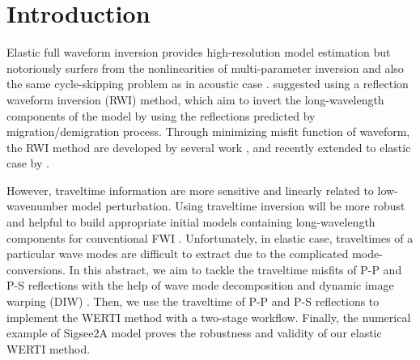 \section{Introduction}
Elastic full
waveform inversion provides high-resolution 
model estimation but notoriously surfers from the nonlinearities of
multi-parameter inversion and also the same cycle-skipping problem as in acoustic
case \cite[]{sears:2008,brossier2009}.
\cite{xu:2012} suggested using a reflection waveform inversion (RWI) method, 
which aim to
invert the long-wavelength components of the model by using the reflections 
predicted by migration/demigration process.
Through minimizing misfit function of waveform, the RWI method are developed
by several work \cite[]{Wu2015b,Zhou2015}, and recently extended to elastic case by
\cite{Guo2016}.

However, traveltime information are more sensitive and linearly related to
low-wavenumber model perturbation. Using traveltime inversion will be more robust and helpful to
build appropriate initial models containing long-wavelength components for
conventional FWI \cite[]{Ma2013, Chi2015, Luo2016}.
Unfortunately, in elastic case, traveltimes of a particular wave modes are difficult
to extract due to the complicated mode-conversions.
In this abstract,   
we aim to tackle the traveltime misfits of P-P and P-S reflections with the help
of wave mode decomposition and dynamic image warping (DIW) \cite[]{Hale2013}.
Then, we use the traveltime of P-P and P-S reflections to implement the 
WERTI method \cite[]{Ma2013} with a two-stage workflow.
Finally, the numerical example of Sigsee2A model proves the robustness and validity of our
elastic WERTI method.
